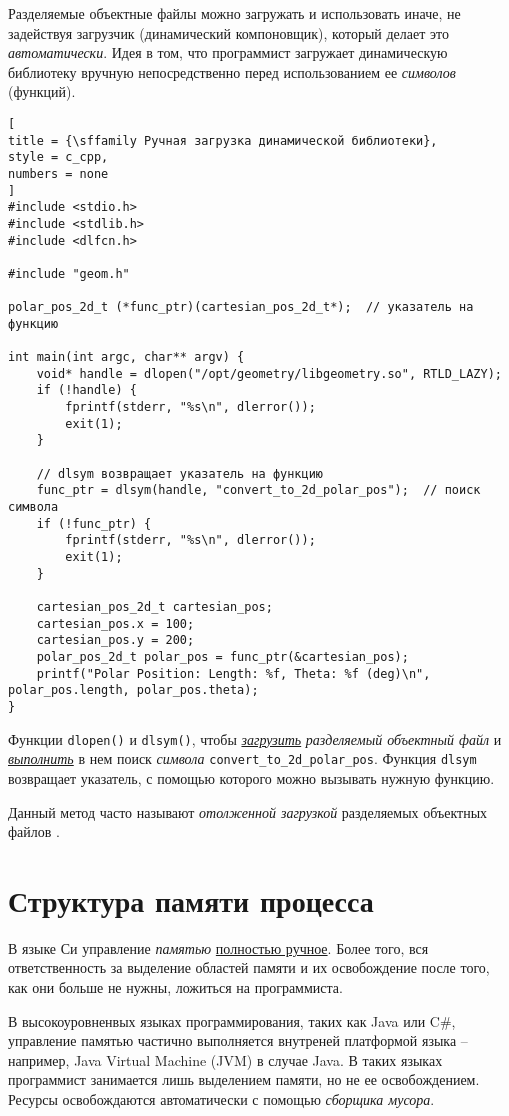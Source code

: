 \documentclass[%
	11pt,
	a4paper,
	utf8,
		]{article}
\begin{document}
Разделяемые объектные файлы можно загружать и использовать иначе, не задействуя загрузчик (динамический компоновщик), который делает это \emph{автоматически}. Идея в том, что программист загружает динамическую библиотеку вручную непосредственно перед использованием ее \emph{символов} (функций).

\begin{lstlisting}[
title = {\sffamily Ручная загрузка динамической библиотеки},
style = c_cpp,
numbers = none
]
#include <stdio.h>
#include <stdlib.h>
#include <dlfcn.h>

#include "geom.h"

polar_pos_2d_t (*func_ptr)(cartesian_pos_2d_t*);  // указатель на функцию

int main(int argc, char** argv) {
    void* handle = dlopen("/opt/geometry/libgeometry.so", RTLD_LAZY);
    if (!handle) {
        fprintf(stderr, "%s\n", dlerror());
        exit(1);
    }
    
    // dlsym возвращает указатель на функцию
    func_ptr = dlsym(handle, "convert_to_2d_polar_pos");  // поиск символа
    if (!func_ptr) {
        fprintf(stderr, "%s\n", dlerror());
        exit(1);
    }
    
    cartesian_pos_2d_t cartesian_pos;
    cartesian_pos.x = 100;
    cartesian_pos.y = 200;
    polar_pos_2d_t polar_pos = func_ptr(&cartesian_pos);
    printf("Polar Position: Length: %f, Theta: %f (deg)\n", polar_pos.length, polar_pos.theta);
}
\end{lstlisting}

Функции \verb|dlopen()| и \verb|dlsym()|, чтобы \underline{\itshape загрузить} \emph{разделяемый объектный файл} и \underline{\itshape выполнить} в нем поиск \emph{символа} \verb|convert_to_2d_polar_pos|. Функция \verb|dlsym| возвращает указатель, с помощью которого можно вызывать нужную функцию.

Данный метод часто называют \emph{отолженной загрузкой} разделяемых объектных файлов \cite[]{amini-extreme-c:2022}.

\section{Структура памяти процесса}

В языке Си управление \emph{памятью} \underline{полностью ручное}. Более того, вся ответственность за выделение областей памяти и их освобождение после того, как они больше не нужны, ложиться на программиста.

В высокоуровненвых языках программирования, таких как Java или C\#, управление памятью частично выполняется внутреней платформой языка -- например, Java Virtual Machine (JVM) в случае Java. В таких языках программист занимается лишь выделением памяти, но не ее освобождением. Ресурсы освобождаются автоматически с помощью \emph{сборщика мусора}.
\end{document}
